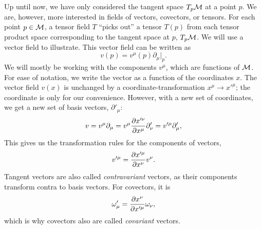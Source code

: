 Up until now, we have only considered the tangent space $T_p \mathcal{M}$ at a point $p$.
We are, however, more interested in fields of vectors, covectors, or tensors.
For each point $p \in \mathcal{M}$, a tensor field $T$ ``picks out'' a tensor $T(p)$ from each tensor product space corresponding to the tangent space at $p$, $T_p \mathcal{M}$.
We will use a vector field to illustrate.
This vector field can be written as
%
\begin{equation}
    v(p) = v^\mu(p) \partial_\mu |_p. 
\end{equation}
%
We will mostly be working with the components $v^\mu$, which are functions of $\mathcal{M}$.
For ease of notation, we write the vector as a function of the coordinates $x$.
The vector field $v(x)$ is unchanged by a coordinate-transformation $x^\mu \rightarrow {x'}^\mu$; the coordinate is only for our convenience.
However, with a new set of coordinates, we get a new set of basis vectors, $\partial'_\mu$:
%
\begin{equation}
    v = v^\mu \partial_\mu = v^\mu \diffp{x'^\nu}{x^\mu} \partial'_\nu
    = v'^\mu \partial_\mu',
\end{equation}
%
This gives us the transformation rules for the components of vectors,
%
\begin{equation}
    v'^\mu = \diffp{x'^\mu}{x^\nu} v^\nu.
\end{equation}
%
Tangent vectors are also called \emph{contravariant} vectors, as their components transform contra to basis vectors.
For covectors, it is
%
\begin{equation}
    \omega'_\mu = \diffp{x^\nu}{x'^\mu} \omega_\nu,
\end{equation}
%
which is why covectors also are called \emph{covariant} vectors.

